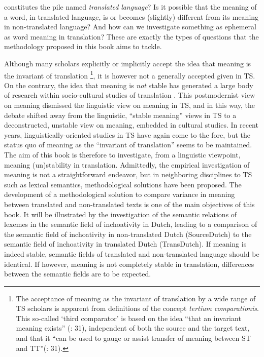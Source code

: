 constitutes the pile named \textit{translated} \textit{language}? Is it possible that the meaning of a word, in translated language, is or becomes (slightly) different from its meaning in non-translated language? And how can we investigate something as ephemeral as word meaning in translation? These are exactly the types of questions that the methodology proposed in this book aims to tackle.



Although many scholars explicitly or implicitly accept the idea that meaning is the invariant of translation  \footnote{The acceptance of meaning as the invariant of translation by a wide range of TS scholars is apparent from definitions of the concept \textit{tertium} \textit{comparationis}. This so-called ‘third comparator’ is based on the idea “that an invariant meaning exists” (\citealt{Hatim & Munday 2004}: 31), independent of both the source and the target text, and that it “can be used to gauge or assist transfer of meaning between ST and TT”(\citealt{Hatim & Munday 2004}: 31).}, it is however not a generally accepted given in TS. On the contrary, the idea that meaning is \textit{not} stable has generated a large body of research within socio-cultural studies of translation  \citep{Baumgarten 2012}. This postmodernist view on meaning dismissed the linguistic view on meaning in TS, and in this way, the debate shifted away from the linguistic, “stable meaning” views in TS to a deconstructed, unstable view on meaning, embedded in cultural studies. In recent years, linguistically-oriented studies in TS have again come to the fore, but the status quo of meaning as the “invariant of translation” seems to be maintained. The aim of this book is therefore to investigate, from a linguistic viewpoint, meaning (un)stability in translation. Admittedly, the empirical investigation of meaning is not a straightforward endeavor, but in neighboring disciplines to TS such as lexical semantics, methodological solutions have been proposed. The development of a methodological solution to compare variance in meaning between translated and non-translated texts is one of the main objectives of this book. It will be illustrated by the investigation of the semantic relations of lexemes in the semantic field of inchoativity in Dutch, leading to a comparison of the semantic field of inchoativity in non-translated Dutch (SourceDutch) to the semantic field of inchoativity in translated Dutch (TransDutch). If meaning is indeed stable, semantic fields of translated and non-translated language should be identical. If however, meaning is not completely stable in translation, differences between the semantic fields are to be expected. 



